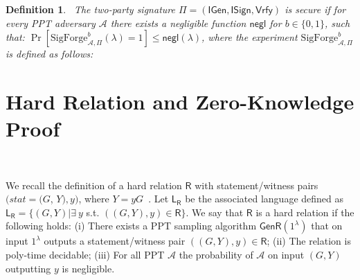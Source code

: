 \documentclass{llncs}
\newtheorem{Definition}{Definition}
\begin{document}
\begin{Definition}~\label{two-party signature EUF-CMA}
The two-party signature $\Pi=(\mathsf{IGen},\mathsf{ISign},\mathsf{Vrfy})$ is secure if for every PPT adversary $\mathcal{A}$ there exists a negligible function $\mathsf{negl}$ for $b\in\{0,1\}$, such that: $\Pr[\text{SigForge}^b_{\mathcal{A},\Pi}(\lambda) = 1] \leq \mathsf{negl}(\lambda)$, where the experiment $\text{SigForge}^b_{\mathcal{A},\Pi}$ is defined as follows:
\end{Definition}

\begin{center}
\end{center}

\section{Hard Relation and Zero-Knowledge Proof}~\label{Hard Relation and Zero-Knowledge Proof}

We recall the definition of a hard relation $\mathsf{R}$ with statement/witness pairs $(stat=(G$, $Y),y)$, where $Y=yG$~\cite{AumayrEEFHMMR20}. Let $\mathsf{L}_\mathsf{R}$ be the associated language defined as $\mathsf{L}_\mathsf{R}= \{(G,Y)| \exists\  y$ s.t. $((G,Y),y) \in \mathsf{R}\}$. We say that $\mathsf{R}$ is a hard relation if the following holds: (i) There exists a PPT sampling algorithm $\mathsf{GenR}(1^\lambda)$ that on input $1^\lambda$ outputs a statement/witness pair $((G,Y),y) \in \mathsf{R}$; (ii) The relation is poly-time decidable; (iii) For all PPT $\mathcal{A}$ the probability of $\mathcal{A}$ on input $(G,Y)$ outputting $y$ is negligible.
\end{document}
